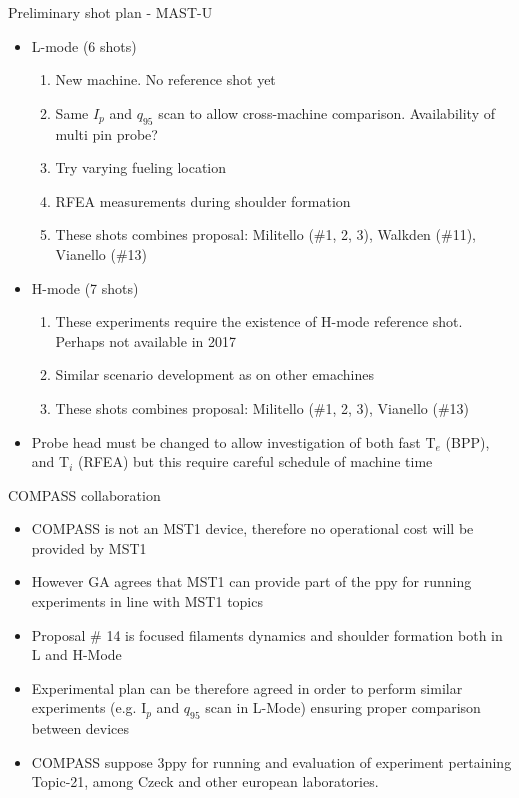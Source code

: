 \documentclass[10pt, compress]{beamer}
\begin{document}
\begin{frame}{Preliminary shot plan  - MAST-U}
	\begin{itemize}
		\item L-mode (6 shots)
		\begin{enumerate}		
			\item New machine. No reference shot yet			
			\item Same $I_p$ and $q_95$ scan to allow
                          cross-machine comparison. Availability of multi pin probe? 
			\item Try varying fueling location
			\item RFEA measurements during shoulder
                          formation 
                        \item These shots combines proposal: Militello
                          (\#1, 2, 3), Walkden (\#11), Vianello (\#13)
		\end{enumerate}
		\item H-mode (7 shots)
		\begin{enumerate}
			\item These experiments require the existence of H-mode reference shot. Perhaps not available in 2017
			\item Similar scenario development as on other emachines
                        \item These shots combines proposal: Militello
                          (\#1, 2, 3),  Vianello (\#13)
		\end{enumerate}
		\item Probe head must be changed to allow
                  investigation of both fast T$_e$ (BPP),  and T$_i$
                  (RFEA) but this require careful schedule of machine time
	\end{itemize}
\end{frame}

\begin{frame}{COMPASS collaboration}
\begin{itemize}
\item COMPASS is not an MST1 device, therefore no operational cost
  will be provided by MST1
\item However GA agrees that MST1 can provide part of the ppy for
  running experiments in line with MST1 topics
\item Proposal \# 14 is focused filaments dynamics and shoulder
  formation both in L and H-Mode
\item Experimental plan can be therefore agreed in order to perform
  similar experiments (e.g. I$_p$ and $q_{95}$ scan in L-Mode)
  ensuring proper comparison between devices
\item COMPASS suppose 3ppy for running and evaluation of experiment
  pertaining Topic-21, among Czeck and other european laboratories.
\end{itemize}
\end{frame}
\end{document}
